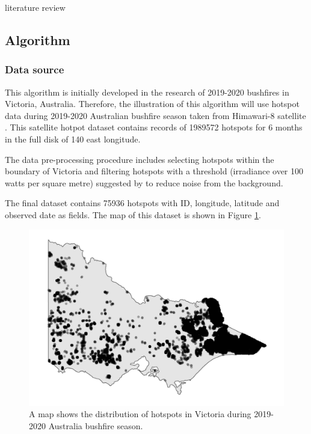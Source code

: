 literature review

\hypertarget{algorithm}{%
\subsection{Algorithm}\label{algorithm}}

\hypertarget{data-source}{%
\subsubsection{Data source}\label{data-source}}

This algorithm is initially developed in the research of 2019-2020
bushfires in Victoria, Australia. Therefore, the illustration of this
algorithm will use hotspot data during 2019-2020 Australian bushfire
season taken from Himawari-8 satellite \citep{jaxa}. This satellite
hotpot dataset contains records of 1989572 hotspots for 6 months in the
full disk of 140 \textdegree east longitude.

The data pre-processing procedure includes selecting hotspots within the
boundary of Victoria and filtering hotspots with a threshold (irradiance
over 100 watts per square metre) suggested by \citet{hotspots} to reduce
noise from the background.

The final dataset contains 75936 hotspots with ID, longitude, latitude
and observed date as fields. The map of this dataset is shown in Figure
\ref{fig:hotspots}.

\begin{Schunk}
\begin{figure}
\includegraphics[width=0.8\linewidth]{figures/before_clustering} \caption[A map shows the distribution of hotspots in Victoria during 2019-2020 Australia bushfire season]{A map shows the distribution of hotspots in Victoria during 2019-2020 Australia bushfire season.}\label{fig:hotspots}
\end{figure}
\end{Schunk}

